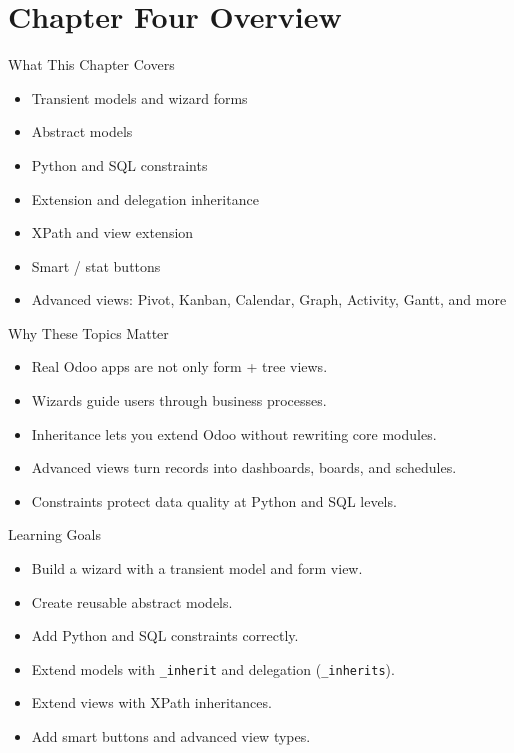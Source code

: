 \section{Chapter Four Overview}

\begin{frame}{What This Chapter Covers}
	\begin{itemize}
		\item Transient models and wizard forms
		\item Abstract models
		\item Python and SQL constraints
		\item Extension and delegation inheritance
		\item XPath and view extension
		\item Smart / stat buttons
		\item Advanced views: Pivot, Kanban, Calendar, Graph, Activity, Gantt, and more
	\end{itemize}
\end{frame}

\begin{frame}{Why These Topics Matter}
	\begin{itemize}
		\item Real Odoo apps are not only form + tree views.
		\item Wizards guide users through business processes.
		\item Inheritance lets you extend Odoo without rewriting core modules.
		\item Advanced views turn records into dashboards, boards, and schedules.
		\item Constraints protect data quality at Python and SQL levels.
	\end{itemize}
\end{frame}

\begin{frame}{Learning Goals}
	\begin{itemize}
		\item Build a wizard with a transient model and form view.
		\item Create reusable abstract models.
		\item Add Python and SQL constraints correctly.
		\item Extend models with \texttt{\_inherit} and delegation (\texttt{\_inherits}).
		\item Extend views with XPath inheritances.
		\item Add smart buttons and advanced view types.
	\end{itemize}
\end{frame}
